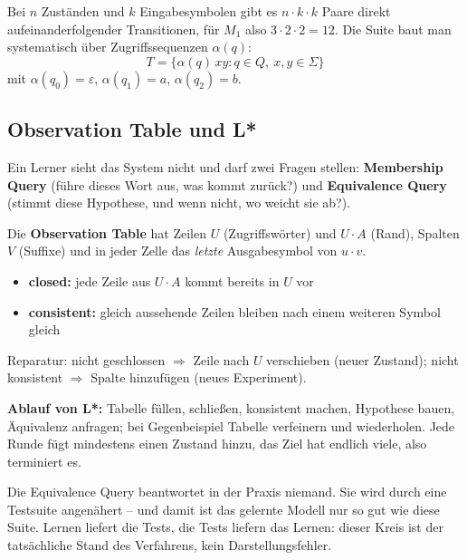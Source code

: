 \documentclass[12pt, a4paper]{article}
\begin{document}
Bei $n$ Zuständen und $k$ Eingabesymbolen gibt es $n \cdot k \cdot k$ Paare direkt
aufeinanderfolgender Transitionen, für $M_1$ also $3 \cdot 2 \cdot 2 = 12$. Die Suite
baut man systematisch über Zugriffssequenzen $\alpha(q)$:
\[
T = \{\alpha(q)\,xy : q \in Q,\ x,y \in \Sigma\}
\]
mit $\alpha(q_0) = \varepsilon$, $\alpha(q_1) = a$, $\alpha(q_2) = b$.

\subsection{Observation Table und L*}

Ein Lerner sieht das System nicht und darf zwei Fragen stellen:
\textbf{Membership Query} (führe dieses Wort aus, was kommt zurück?) und
\textbf{Equivalence Query} (stimmt diese Hypothese, und wenn nicht, wo weicht sie ab?).

\begin{definitionbox}
Die \textbf{Observation Table} hat Zeilen $U$ (Zugriffswörter) und $U\!\cdot\!A$
(Rand), Spalten $V$ (Suffixe) und in jeder Zelle das \emph{letzte} Ausgabesymbol von
$u \cdot v$.
\begin{itemize}
  \item \textbf{closed:} jede Zeile aus $U\!\cdot\!A$ kommt bereits in $U$ vor
  \item \textbf{consistent:} gleich aussehende Zeilen bleiben nach einem weiteren
        Symbol gleich
\end{itemize}
\end{definitionbox}

Reparatur: nicht geschlossen $\Rightarrow$ Zeile nach $U$ verschieben (neuer Zustand);
nicht konsistent $\Rightarrow$ Spalte hinzufügen (neues Experiment).

\textbf{Ablauf von L*:} Tabelle füllen, schließen, konsistent machen, Hypothese bauen,
Äquivalenz anfragen; bei Gegenbeispiel Tabelle verfeinern und wiederholen. Jede Runde
fügt mindestens einen Zustand hinzu, das Ziel hat endlich viele, also terminiert es.

\begin{notebox}
Die Equivalence Query beantwortet in der Praxis niemand. Sie wird durch eine
Testsuite angenähert -- und damit ist das gelernte Modell nur so gut wie diese Suite.
Lernen liefert die Tests, die Tests liefern das Lernen: dieser Kreis ist der
tatsächliche Stand des Verfahrens, kein Darstellungsfehler.
\end{notebox}

\end{document}
